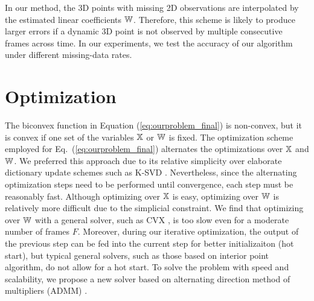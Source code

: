 In our method, the 3D points with missing 2D observations are interpolated by the estimated linear coefficients $\mathbb W$. Therefore, this scheme is likely to produce larger errors if a dynamic 3D point is not observed by multiple consecutive frames across time. In our experiments, we test the accuracy of our algorithm under different missing-data rates.




\section{Optimization}\label{sec:solver}

The biconvex function in Equation (\ref{eq:ourproblem_final}) is non-convex, but it is convex if one set of the variables $\mathbb X$ or $\mathbb W$ is fixed.
The optimization scheme employed for Eq.~(\ref{eq:ourproblem_final}) alternates the optimizations over $\mathbb X$ and $\mathbb W$. We preferred this approach due to its relative simplicity over elaborate dictionary update schemes such as K-SVD \cite{aharon2006img}. Nevertheless, since the alternating optimization steps need to be performed until convergence, each step must be reasonably fast.
Although optimizing over $\mathbb X$ is easy, optimizing over $\mathbb W$ is relatively more difficult due to the simplicial constraint.
We find that optimizing over $\mathbb W$ with a general solver, such as CVX \cite{cvx}, is too slow even for a moderate number of frames $F$.
Moreover, during our iterative optimization, the output of the previous step can be fed into the current step for better initializaiton (hot start), but typical general solvers, such as those based on interior point algorithm, do not allow for a hot start.
To solve the problem with speed and scalability, we propose a new solver based on alternating direction method of multipliers (ADMM) \cite{boyd2011distributed}.

